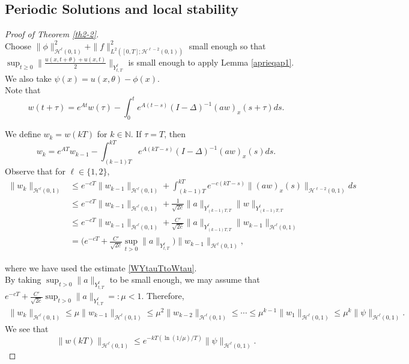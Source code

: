 \documentclass[10pt,a4paper,final]{article}
\numberwithin{equation}{section}
\newcommand{\N}{\mathbb{N}}
\newcommand{\cH}{\mathcal{H}}
\begin{document}
\subsection{Periodic Solutions and local stability}
\begin{proof}[Proof of Theorem \ref{th2-2}]\ \\
Choose $\|\phi\|_{\cH^{\ell}(0,1)}^2+\|f\|_{L^2([0,T];\cH^{\ell-2}(0,1))}^2$ small enough so that $\sup_{t\geq 0}\|\frac{u(x,t+\theta)+u(x,t)}{2}\|_{Y^{\ell}_{t,T}}$ is small enough to apply Lemma \ref{aprieqap1}. We also take $\psi(x)=u(x,\theta)-\phi(x)$.\\

Note that
$$w(t+\tau)=e^{At}w(\tau)-\int_{0}^{t}e^{A(t-s)}(I-\Delta)^{-1}(aw)_x(s+\tau)ds.$$

We define $w_k=w(kT)$ for $k\in \N$. If $\tau=T$, then 
$$w_k=e^{AT}w_{k-1}-\int_{(k-1)T}^{kT}e^{A(kT-s)}(I-\Delta)^{-1}(aw)_x(s)ds.$$
Observe that for $\ell\in \{1,2\}$,
\begin{align*}
    \|w_k\|_{\cH^{\ell}(0,1)}&\leq e^{-cT}\|w_{k-1}\|_{\cH^{\ell}(0,1)}+\int_{(k-1)T}^{kT}e^{-c(kT-s)}\|(aw)_x(s)\|_{\cH^{\ell-2}(0,1)}ds\\
    &\leq  e^{-cT}\|w_{k-1}\|_{\cH^{\ell}(0,1)}+\frac{1}{\sqrt{2c}}\|a\|_{Y^{\ell}_{(k-1)T,T}}\|w\|_{Y^{\ell}_{(k-1)T,T}}\\
    &\leq   e^{-cT}\|w_{k-1}\|_{\cH^{\ell}(0,1)}+\frac{C'}{\sqrt{2c}}\|a\|_{Y^{\ell}_{(k-1)T,T}}\|w_{k-1}\|_{\cH^{\ell}(0,1)} \\
    &= \bigg(e^{-cT}+\frac{C'}{\sqrt{2c}}\sup_{t>0}\|a\|_{Y^{\ell}_{t,T}}\bigg)\|w_{k-1}\|_{\cH^{\ell}(0,1)},
\end{align*}

where we have used the estimate \eqref{WYtauTtoWtau}. \\

By taking $\sup_{t>0}\|a\|_{Y^{\ell}_{t,T}}$ to be small enough, we may assume that $e^{-cT}+\frac{C'}{\sqrt{2c}}\sup_{t>0}\|a\|_{Y^{\ell}_{t,T}}=:\mu<1$. Therefore, 
\begin{align*}
    \|w_k\|_{\cH^{\ell}(0,1)}\leq \mu\|w_{k-1}\|_{\cH^{\ell}(0,1)}\leq \mu^2\|w_{k-2}\|_{\cH^{\ell}(0,1)}\leq \cdots\leq \mu^{k-1}\|w_1\|_{\cH^{\ell}(0,1)}\leq \mu^k\|\psi\|_{\cH^{\ell}(0,1)}.
\end{align*}
We see that 
$$\|w(kT)\|_{\cH^{\ell}(0,1)}\leq e^{-kT(\ln(1/\mu)/T)}\|\psi\|_{\cH^{\ell}(0,1)}.$$


\end{proof}
\end{document}
